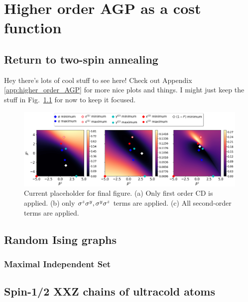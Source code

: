 \chapter{Higher order AGP as a cost function}

\section{Return to two-spin annealing}

Hey there's lots of cool stuff to see here! Check out Appendix \ref{app:higher_order_AGP} for more nice plots and things. I might just keep the stuff in Fig.~\ref{fig:two_spin_higher_order} for now to keep it focused.

\begin{figure}[h]
    \centering
    \includegraphics[width=\linewidth]{images/2spin_Integrals_scaled_by_norm_final.png} \caption[Two-spin annealing fidelity contour plots]{Current placeholder for final figure. (a) Only first order CD is applied. (b) only $\sigma^z\sigma^y, \sigma^y\sigma^z$ terms are applied. (c) All second-order terms are applied.}\label{fig:two_spin_higher_order}
    \end{figure}

\section{Random Ising graphs}

\subsection{Maximal Independent Set}

\section{Spin-1/2 XXZ chains of ultracold atoms}